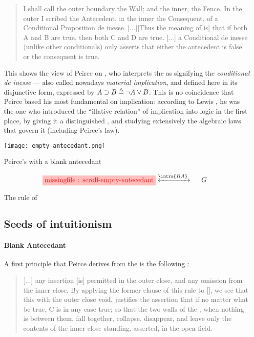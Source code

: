 \begin{scope}
\begin{quote}
  I shall call the outer boundary the Wall; and the inner, the Fence. In the
outer I scribed the Antecedent, in the inner the Consequent, of a Conditional
Proposition de inesse. [...][Thus the meaning of  is] that if
both A and B are true, then both C and D are true. [...] a Conditional de inesse
(unlike other conditionals) only asserts that either the antecedent is false or
the consequent is true. 
\end{quote}

This shows the  view of Peirce on , who interprets the
 as signifying the \textit{conditional de inesse} --- also called
nowadays \emph{material implication}, and defined here in its disjunctive form,
expressed  by $A \supset B \triangleq \neg A \lor B$. This is no
coincidence that Peirce based his most fundamental  on implication:
according to Lewis , he was the one who
introduced the ``illative relation'' of implication into  logic in
the first place, by giving it a distinguished , and studying
extensively the algebraic laws that govern it (including Peirce's law).

\begin{marginfigure}
  \texttt{[image: empty-antecedant.png]}
  \caption{Peirce's  with a blank antecedant}
\end{marginfigure}

\begin{marginfigure}
  $$
  \!\!\!\!\!\!\!\!\stkfig{1}{scroll-empty-antecedant}
  \!\!\!\!\xinvstep{\intro{BA}}~~~~
  G
  $$
  \caption{The rule of }
\end{marginfigure}

\subsection{Seeds of intuitionism}

\paragraph{Blank Antecedant}

A first principle that Peirce derives from the  is the following
\cite[p.~534]{peirce_prolegomena_1906}:

\begin{quote}
  [...] any insertion [is] permitted in the outer close, and any omission from
the inner close. By applying the former clause of this rule to
[], we see that this  with the outer close void,
justifies the assertion that if no matter what be true, C is in any case true;
so that the two walls of the , when nothing is between them, fall
together, collapse, disappear, and leave only the contents of the inner close
standing, asserted, in the open field.
\end{quote}


\end{scope}
